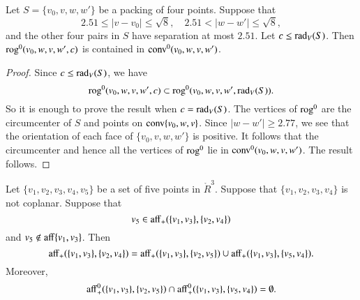 \begin{tarskidata}
\begin{tarski}
\begin{lemma}
Let $S=\{v_0,v,w,w'\}$ be a packing of four points.
Suppose that
   $$
   2.51\le |v-v_0|\le\sqrt8,\quad 2.51< |w-w'|\le\sqrt8,
   $$
and the other four pairs in $S$ have separation at most $2.51$.
Let $c\le \operatorname{rad}_V(S)$.
Then ${\operatorname{rog}}^0(v_0,w,v,w',c)$ is contained in
${\operatorname{conv}}^0(v_0,w,v,w')$.
\end{lemma}

\begin{proof}  Since $c\le \operatorname{rad}_V(S)$, we have
  $$
  {\operatorname{rog}}^0(v_0,w,v,w',c)\subset {\operatorname{rog}}^0(v_0,w,v,w',\operatorname{rad}_V(S)).
  $$
So it is enough to prove the result when $c=\operatorname{rad}_V(S)$.
The vertices of ${\operatorname{rog}}^0$ are the circumcenter of $S$ and points
on ${\operatorname{conv}}\{v_0,w,v\}$.
Since $|w-w'|\ge 2.77$, we see that the orientation of each face
of $\{v_0,v,w,w'\}$ is positive.   It follows that the circumcenter
and hence all
the vertices of ${\operatorname{rog}}^0$ lie in ${\operatorname{conv}}^0(v_0,w,v,w')$.
The result follows.
\end{proof}
\end{tarski}





\begin{tarski}

\begin{lemma}
Let $\{v_1,v_2,v_3,v_4,v_5\}$ be a set of five
points in $\ring{R}^3$.  Suppose that $\{v_1,v_2,v_3,v_4\}$ is
not coplanar.  Suppose that 
    $$v_5\in {\operatorname{aff}}_+(\{v_1,v_3\},\{v_2,v_4\})$$
and $v_5\not\in{\operatorname{aff}}\{v_1,v_3\}$.
Then 
    $$
    {\operatorname{aff}}_+(\{v_1,v_3\},\{v_2,v_4\}) = 
{\operatorname{aff}}_+(\{v_1,v_3\},\{v_2,v_5\}) \cup
{\operatorname{aff}}_+(\{v_1,v_3\},\{v_5,v_4\}).
    $$
Moreover,
   $$
{\operatorname{aff}}^0_+(\{v_1,v_3\},\{v_2,v_5\}) \cap
{\operatorname{aff}}^0_+(\{v_1,v_3\},\{v_5,v_4\}) =\emptyset .
   $$
\end{lemma}


\end{tarski}
\end{tarskidata}
